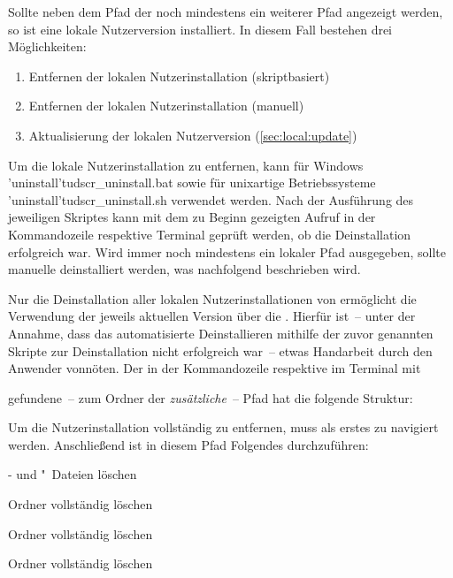 Sollte neben dem Pfad der \Distro noch mindestens ein weiterer Pfad angezeigt 
werden, so ist eine lokale Nutzerversion installiert. In diesem Fall bestehen
drei Möglichkeiten:
%
\begin{enumerate}
\item Entfernen der lokalen Nutzerinstallation (skriptbasiert)
\item Entfernen der lokalen Nutzerinstallation (manuell)
\item Aktualisierung der lokalen Nutzerversion (\autoref{sec:local:update})
\end{enumerate}

Um die lokale Nutzerinstallation zu entfernen, kann für Windows
\GitHubFile*'uninstall'{tudscr_uninstall.bat} sowie für unixartige 
Betriebssysteme \GitHubFile*'uninstall'{tudscr_uninstall.sh} verwendet 
werden. Nach der Ausführung des jeweiligen Skriptes kann mit dem zu Beginn 
gezeigten Aufruf in der Kommandozeile respektive Terminal geprüft werden, ob 
die Deinstallation erfolgreich war. Wird immer noch mindestens ein lokaler Pfad 
ausgegeben, sollte \TUDScript manuelle deinstalliert werden, was nachfolgend 
beschrieben wird.

Nur die Deinstallation aller lokalen Nutzerinstallationen von \TUDScript 
ermöglicht die Verwendung der jeweils aktuellen Version über die \Distro. 
Hierfür ist~-- unter der Annahme, dass das automatisierte Deinstallieren 
mithilfe der zuvor genannten Skripte zur Deinstallation nicht erfolgreich 
war~-- etwas Handarbeit durch den Anwender vonnöten. Der in der Kommandozeile 
respektive im Terminal mit
%
\begin{quoting}
\RET
\end{quoting}
%
gefundene~-- zum Ordner der \Distro \emph{zusätzliche}~-- Pfad hat die folgende 
Struktur:
%
\begin{quoting}
\end{quoting}
%
Um die Nutzerinstallation vollständig zu entfernen, muss als erstes zu 
 navigiert werden. Anschließend ist in diesem 
Pfad Folgendes durchzuführen:
%
\settowidth{}%
\begin{description}[labelwidth=\tempdim,labelsep=.5em]
\item[\Path{tex/latex/tudscr/}]- und "~Dateien löschen
\item[\Path{tex/latex/tudscr/}]Ordner  vollständig löschen
\item[\Path{doc/latex/}] Ordner  vollständig löschen
\item[\Path{source/latex/}] Ordner  vollständig löschen
\end{description}

